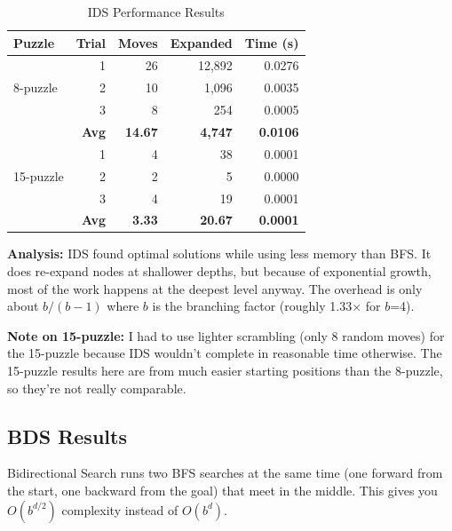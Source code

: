 \documentclass[letterpaper]{article}
\begin{document}
\begin{table}[h]
\centering
\tiny
\begin{tabular}{lrrrr}
\toprule
\textbf{Puzzle} & \textbf{Trial} & \textbf{Moves} & \textbf{Expanded} & \textbf{Time (s)} \\
\midrule
\multirow{3}{*}{8-puzzle} & 1 & 26 & 12,892 & 0.0276 \\
& 2 & 10 & 1,096 & 0.0035 \\
& 3 & 8 & 254 & 0.0005 \\
\cmidrule{2-5}
& \textbf{Avg} & \textbf{14.67} & \textbf{4,747} & \textbf{0.0106} \\
\midrule
\multirow{3}{*}{15-puzzle} & 1 & 4 & 38 & 0.0001 \\
& 2 & 2 & 5 & 0.0000 \\
& 3 & 4 & 19 & 0.0001 \\
\cmidrule{2-5}
& \textbf{Avg} & \textbf{3.33} & \textbf{20.67} & \textbf{0.0001} \\
\bottomrule
\end{tabular}
\caption{IDS Performance Results}
\end{table}

\textbf{Analysis:} IDS found optimal solutions while using less memory than BFS. It does re-expand nodes at shallower depths, but because of exponential growth, most of the work happens at the deepest level anyway. The overhead is only about $b/(b-1)$ where $b$ is the branching factor (roughly 1.33× for $b$=4).

\textbf{Note on 15-puzzle:} I had to use lighter scrambling (only 8 random moves) for the 15-puzzle because IDS wouldn't complete in reasonable time otherwise. The 15-puzzle results here are from much easier starting positions than the 8-puzzle, so they're not really comparable.

\subsection{BDS Results}

Bidirectional Search runs two BFS searches at the same time (one forward from the start, one backward from the goal) that meet in the middle. This gives you $O(b^{d/2})$ complexity instead of $O(b^d)$.
\end{document}

